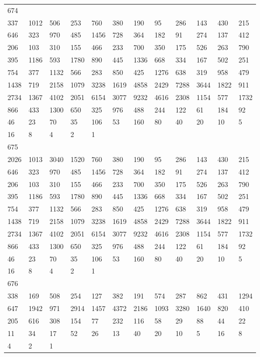 \begin{longtable}{llllllllllll}
674&&&&&&&&&&&\\
337& 1012& 506& 253& 760& 380& 190& 95& 286& 143& 430& 215\\
646& 323& 970& 485& 1456& 728& 364& 182& 91& 274& 137& 412\\
206& 103& 310& 155& 466& 233& 700& 350& 175& 526& 263& 790\\
395& 1186& 593& 1780& 890& 445& 1336& 668& 334& 167& 502& 251\\
754& 377& 1132& 566& 283& 850& 425& 1276& 638& 319& 958& 479\\
1438& 719& 2158& 1079& 3238& 1619& 4858& 2429& 7288& 3644& 1822& 911\\
2734& 1367& 4102& 2051& 6154& 3077& 9232& 4616& 2308& 1154& 577& 1732\\
866& 433& 1300& 650& 325& 976& 488& 244& 122& 61& 184& 92\\
46& 23& 70& 35& 106& 53& 160& 80& 40& 20& 10& 5\\
16& 8& 4& 2& 1& \\

675&&&&&&&&&&&\\
2026& 1013& 3040& 1520& 760& 380& 190& 95& 286& 143& 430& 215\\
646& 323& 970& 485& 1456& 728& 364& 182& 91& 274& 137& 412\\
206& 103& 310& 155& 466& 233& 700& 350& 175& 526& 263& 790\\
395& 1186& 593& 1780& 890& 445& 1336& 668& 334& 167& 502& 251\\
754& 377& 1132& 566& 283& 850& 425& 1276& 638& 319& 958& 479\\
1438& 719& 2158& 1079& 3238& 1619& 4858& 2429& 7288& 3644& 1822& 911\\
2734& 1367& 4102& 2051& 6154& 3077& 9232& 4616& 2308& 1154& 577& 1732\\
866& 433& 1300& 650& 325& 976& 488& 244& 122& 61& 184& 92\\
46& 23& 70& 35& 106& 53& 160& 80& 40& 20& 10& 5\\
16& 8& 4& 2& 1& \\

676&&&&&&&&&&&\\
338& 169& 508& 254& 127& 382& 191& 574& 287& 862& 431& 1294\\
647& 1942& 971& 2914& 1457& 4372& 2186& 1093& 3280& 1640& 820& 410\\
205& 616& 308& 154& 77& 232& 116& 58& 29& 88& 44& 22\\
11& 34& 17& 52& 26& 13& 40& 20& 10& 5& 16& 8\\
4& 2& 1& \\


\end{longtable}
